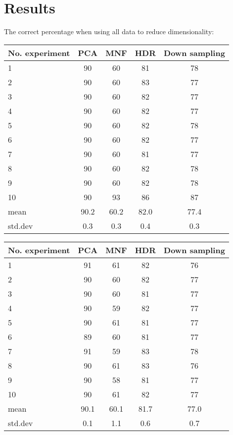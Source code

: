 \documentclass{article}
\begin{document}
\section{Results}
The correct percentage when using all data to reduce dimensionality:
\begin{table*}[h!]
\begin{minipage}{.4\linewidth}
\centering
\begin{tabular}{lcccc}
\hline
No. experiment & PCA & MNF & HDR & Down sampling\\
\hline
1 &  90 &  60 & 81 & 78 \\
2 &  90 &  60 & 83 & 77 \\
3 &  90 &  60 & 82 & 77 \\
4 &  90 &  60 & 82 & 77 \\
5 &  90 &  60 & 82 & 78 \\
6 &  90 &  60 & 82 & 77 \\
7 &  90 &  60 & 81 & 77 \\
8 &  90 &  60 & 82 & 78 \\
9 &  90 &  60 & 82 & 78 \\
10 &  90 &  93 & 86 & 87 \\
\hline
mean & 90.2 & 60.2 & 82.0 & 77.4 \\
std.dev & 0.3 & 0.3 & 0.4 & 0.3\\
\hline
\end{tabular}
\caption{Table of training correct percentages when using whole data set to reduce dimensionality}
\end{minipage}
\qquad
\qquad
\qquad
\qquad
\begin{minipage}{.4\linewidth}
\begin{tabular}{lcccc}
\hline
No. experiment & PCA & MNF & HDR & Down sampling\\
\hline
1 &  91 &  61 & 82 & 76 \\
2 &  90 &  60 & 82 & 77 \\
3 &  90 &  60 & 81 & 77 \\
4 &  90 &  59 & 82 & 77 \\
5 &  90 &  61 & 81 & 77 \\
6 &  89 &  60 & 81 & 77 \\
7 &  91 &  59 & 83 & 78 \\
8 &  90 &  61 & 83 & 76 \\
9 &  90 &  58 & 81 & 77 \\
10 &  90 & 61 & 82 & 77 \\
\hline
mean & 90.1 & 60.1 & 81.7 & 77.0 \\
std.dev & 0.1 & 1.1 & 0.6 & 0.7\\
\hline
\end{tabular}
\caption{Table of test correct percentages when using whole data set to reduce dimensionality}
\end{minipage}
\label{tab: t1}
\end{table*}
\end{document}
